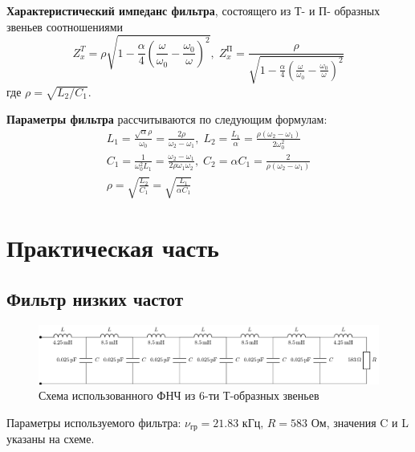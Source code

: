 \textbf{Характеристический импеданс фильтра}, состоящего из Т- и П- образных звеньев соотношениями
\begin{equation}
\label{eq:7.7}
Z^T_x=\rho\sqrt{1-\frac{\alpha}{4}\left(\frac{\omega}{\omega_0}-\frac{\omega_0}{\omega}\right)^2},\;
Z^\text{П}_x=\frac{\rho}{\sqrt{1-\frac{\alpha}{4}\left(\frac{\omega}{\omega_0}-\frac{\omega_0}{\omega}\right)^2}}
\end{equation}
где $\rho=\sqrt{L_2/C_1}$.

\textbf{Параметры фильтра} рассчитываются по следующим формулам:
\begin{equation}
\label{eq:7.8}
\begin{gathered}
L_1=\frac{\sqrt{\alpha}\rho}{\omega_0}=\frac{2\rho}{\omega_2-\omega_1},\;
L_2=\frac{L_1}{\alpha}=\frac{\rho(\omega_2-\omega_1)}{2\omega^2_0}\\
C_1=\frac{1}{\omega^2_0L_1}=\frac{\omega_2-\omega_1}{2\rho\omega_1\omega_2},\;
C_2=\alpha C_1=\frac{2}{\rho(\omega_2-\omega_1)}\\
\rho=\sqrt{\frac{L_2}{C_1}}=\sqrt{\frac{L_1}{\alpha C_1}}
\end{gathered}
\end{equation}

\section{Практическая часть}
\subsection{Фильтр низких частот}
\begin{figure}[H]
	\centering
	\includegraphics[scale=0.75]{chem/chem3}
	\caption{ Схема использованного ФНЧ из 6-ти Т-образных звеньев}
	\label{fig:chem3}
\end{figure}
Параметры используемого фильтра:
$\nu_{\text{гр}}=21.83 \text{ кГц} ,\,R=583\text{ Ом}$, значения C и L указаны на схеме.

